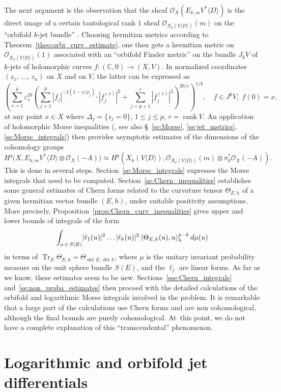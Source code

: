 \documentclass[AHL,Unicode,longabstracts,published]{cedram}
\DeclareMathOperator{\Tr}{Tr}
\DeclareMathOperator{\rank}{rank}
\DeclarePairedDelimiter{\abs}{\lvert}{\rvert}
\newcommand*\cO{\mathcal{O}}
\newcommand*\bC{\mathbb{C}}
\let\leq\leqslant
\begin{document}
The next argument is the observation that the sheaf
$\cO_X(E_{k,m}V^*\langle D\rangle)$ is the direct image of a certain tautological rank $1$ sheaf $\cO_{X_k(V\langle D\rangle)}(m)$ on the ``orbifold $k$-jet bundle'' . Choosing hermitian metrics according to Theorem~\ref{theo:orbi_curv_estimate}, one then gets a hermitian metric on $\cO_{X_k(V\langle D\rangle)}(1)$ associated with an ``orbifold Finsler metric'' on the bundle $J_kV$ of $k$-jets of holomorphic curves $f\colon(\bC,0)\to(X,V)$. In normalized coordinates
$(z_1,\,\dotsc,\,z_n)$ on $X$ and on $V$, the latter can be expressed as
\[
\left(
\sum_{s=1}^k\varepsilon_s^{2b}\left(\sum_{j=1}^p
\left|f_j\right|^{-2(1-s/\rho_j)_+}\left|f_j^{(s)}\right|^2+\sum_{j=p+1}^r\left|f_j^{(s)}\right|^2\right)^{2b/s}
\right)^{1/b},
\quad f\in J^kV,\; f(0)=x,
\]
at any point $x\in X$ where $\Delta_j=\{z_j=0\}$, $1\leq j\leq p$, $r=\rank V$. An application of holomorphic Morse inequalities (\cite{Dem85}, see also \S~\ref{se:Morse}, \ref{se:jet_metrics}, \ref{se:Morse_integrals}) then provides asymptotic estimates of the dimensions of the cohomology groups
\[
H^q\big(X,E_{k,m}V^*\langle D\rangle\otimes\cO_X(-A)\big)\simeq H^q(X_k(V\langle D\rangle),
\cO_{X_k(V\langle D\rangle)}(m)\otimes\pi_k^*\cO_X(-A)).
\]
This is done in several steps. Section~\ref{se:Morse_integrals} expresses the Morse integrals that need to be computed. Section~\ref{se:Chern_inequalities} establishes some general estimates of Chern forms related to the curvature tensor $\Theta_{E,h}$ of a given hermitian vector bundle $(E,h)$, under suitable positivity assumptions. More precisely, Proposition~\ref{prop:Chern_curv_inequalities} gives upper and lower bounds of integrals of the form
\[
\int_{u\,\in\,S(E)}\abs{\ell_1(u)}^2\ldots\abs{\ell_k(u)}^2\,
\langle\Theta_{E,h}(u),u\rangle_h^{p-k}\,d\mu(u)
\]
in terms of $\Tr_E\Theta_{E,h}=\Theta_{\det E,\det h}$, where $\mu$ is the unitary invariant probability measure on the unit sphere bundle $S(E)$, and the $\ell_j$ are linear forms. As far as we know, these estimates seem to be new. Sections~\ref{sse:Chern_integrals} and~\ref{se:non_proba_estimates} then proceed with the detailed calculations of the orbifold and logarithmic Morse integrals involved in the problem. It is remarkable that a large part of the calculations use Chern forms and are non cohomological, although the final bounds are purely cohomological. At~this point, we do not have a complete explanation of this ``transcendental'' phenomenon.

\section{Logarithmic and orbifold jet differentials}\label{se:jet_differentials}
\end{document}
